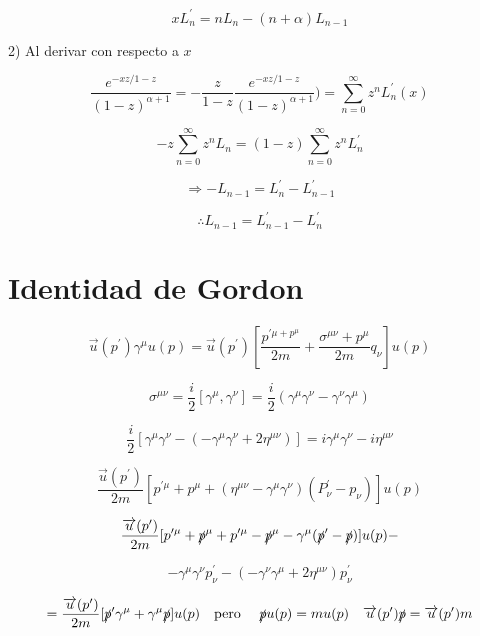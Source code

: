 \documentclass{report}
\begin{document}
\begin{equation}
x L_{n}^{\prime} = n L_n - (n + \alpha ) L_{n-1 }
\end{equation}

2) Al derivar con respecto a $x$

\[\frac{e^{-xz/1-z}}{(1-z)^{\alpha + 1}} = - \frac{z}{1-z} \frac{e^{-xz/1-z}}{(1-z)^{\alpha + 1}}) = \sum_{n=0}^{\infty} z^n L_{n}^{\prime} (x)\]

\[-z \sum _{n = 0}^{\infty } z^n L_n = (1-z) \sum _{n=0} ^{\infty } z^n L_{n}^{\prime } \]

\[\Rightarrow -L_{n-1} = L_{n}^{\prime} - L_{n-1}^{\prime }\]

\begin{equation}
\therefore L_{n-1} = L_{n-1}^{\prime } - L_{n}^{\prime }
\end{equation}


\section{Identidad de Gordon}

\[\overrightarrow{u}(p^{\prime}) \gamma^{\mu} u (p) = \overrightarrow{u} (p^{\prime}) [\frac{p^{\prime \mu + p^{\mu }}}{2m} + \frac{\sigma ^{\mu \nu } + p^{\mu}}{2m} q_{\nu} ] u (p)\]

\[\sigma^{\mu \nu} = \frac{i}{2} [\gamma^{\mu} , \gamma^{\nu} ] = \frac{i}{2} (\gamma^{\mu} \gamma^{\nu} - \gamma^{\nu} \gamma^{\mu} )\]

\[\frac{i}{2} [\gamma^{\mu} \gamma^{\nu} - (- \gamma^{\mu} \gamma^{\nu} + 2 \eta ^{\mu \nu })] = i \gamma^{\mu} \gamma^{\nu} - i \eta^{\mu \nu}\]

\[\frac{\overrightarrow{u}(p^{\prime })}{2m} [p^{\prime \mu } + p^{\mu } + (\eta^{\mu \nu} - \gamma^{\mu }\gamma^{\nu }) (P_{\nu }^{\prime }- p_{\nu })] u (p) \]

\[\frac{\overrightarrow{u}(p^{\prime})}{2m} [p^{\prime \mu} + \slashed{p}^{\mu} + p^{\prime \mu} - \slashed{p}^{\mu}- \gamma^{\mu} (\slashed{p}^{\prime} - \slashed{p})] u (p)-\]

\[-\gamma^{\mu} \gamma^{\nu } p_{\nu}^{\prime} - (- \gamma^{\nu} \gamma^{\mu}+2 \eta ^{\mu \nu})p_{\nu}^{\prime}\]


\[= \frac{\overrightarrow{u}(p^{\prime })}{2m} [\slashed{p}^{\prime } \gamma^{\mu}+ \gamma^{ \mu} \slashed{p} ] u (p) \quad \text{pero } \quad \slashed{p}u(p) = m u (p) \quad \overrightarrow{u}(p^{\prime}) \slashed{p} = \overrightarrow{u} (p^{\prime})m \]
\end{document}
